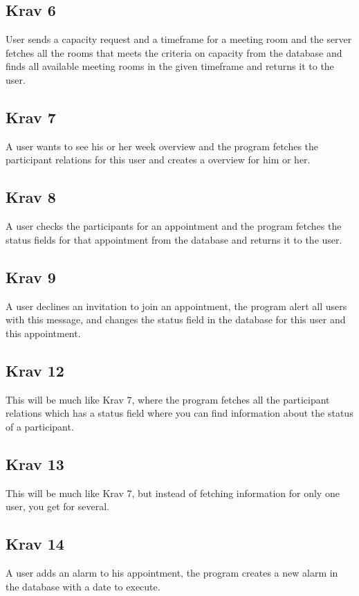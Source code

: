 \documentclass[a4paper, 10pt]{article}
\begin{document}
\subsection*{Krav 6}
User sends a capacity request and a timeframe for a meeting room and the server fetches all the rooms that meets the criteria on capacity from the database and finds all available meeting rooms in the given timeframe and returns it to the user.

\subsection*{Krav 7}
A user wants to see his or her week overview and the program fetches the participant relations for this user and creates a overview for him or her.

\subsection*{Krav 8}
A user checks the participants for an appointment and the program fetches the status fields for that appointment from the database and returns it to the user.

\subsection*{Krav 9}
A user declines an invitation to join an appointment, the program alert all users with this message, and changes the status field in the database for this user and this appointment.

\subsection*{Krav 12}
This will be much like Krav 7, where the program fetches all the participant relations which has a status field where you can find information about the status of a participant.

\subsection*{Krav 13}
This will be much like Krav 7, but instead of fetching information for only one user, you get for several.

\subsection*{Krav 14}
A user adds an alarm to his appointment, the program creates a new alarm in the database with a date to execute.
\end{document}
